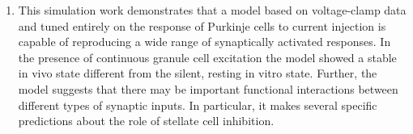 \documentclass[12pt]{article}
\begin{document}
\begin{enumerate}
\item This simulation work demonstrates that a model based on
voltage-clamp data and tuned entirely on the response of Purkinje
cells to current injection is capable of reproducing a wide range of
synaptically activated responses. In the presence of continuous
granule cell excitation the model showed a stable in vivo state
different from the silent, resting in vitro state. Further, the model
suggests that there may be important functional interactions between
different types of synaptic inputs. In particular, it makes
several specific predictions about the role of stellate cell inhibition.

\end{enumerate}
\end{document}
